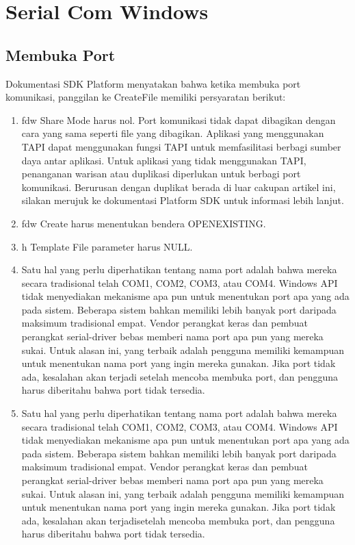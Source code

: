 \section{Serial Com Windows}
	\subsection{Membuka Port}

		Dokumentasi SDK Platform menyatakan bahwa ketika membuka port komunikasi, panggilan ke CreateFile memiliki persyaratan berikut:

	

		\begin{enumerate} 
			
				\item  fdw Share Mode harus nol. Port komunikasi tidak dapat dibagikan dengan cara yang sama seperti file yang dibagikan. Aplikasi yang menggunakan TAPI dapat menggunakan fungsi TAPI untuk memfasilitasi berbagi sumber daya antar aplikasi. Untuk aplikasi yang tidak menggunakan TAPI, penanganan warisan atau duplikasi diperlukan untuk berbagi port komunikasi. Berurusan dengan duplikat berada di luar cakupan artikel ini, silakan merujuk ke dokumentasi Platform SDK untuk informasi lebih lanjut.
				\item  fdw Create harus menentukan bendera OPENEXISTING.
				\item  h Template File parameter harus NULL.

			\item Satu hal yang perlu diperhatikan tentang nama port adalah bahwa mereka secara tradisional telah COM1, COM2, COM3, atau COM4. Windows API tidak menyediakan mekanisme apa pun untuk menentukan port apa yang ada pada sistem. Beberapa sistem bahkan memiliki lebih banyak port daripada maksimum tradisional empat. Vendor perangkat keras dan pembuat perangkat serial-driver bebas memberi nama port apa pun yang mereka sukai. Untuk alasan ini, yang terbaik adalah pengguna memiliki kemampuan untuk menentukan nama port yang ingin mereka gunakan. Jika port tidak ada, kesalahan akan terjadi setelah mencoba membuka port, dan pengguna harus diberitahu bahwa port tidak tersedia.

			\item Satu hal yang perlu diperhatikan tentang nama port adalah bahwa mereka secara tradisional telah COM1, COM2, COM3, atau COM4. Windows API tidak menyediakan mekanisme apa pun untuk menentukan port apa yang ada pada sistem. Beberapa sistem bahkan memiliki lebih banyak port daripada maksimum tradisional empat. Vendor perangkat keras dan pembuat perangkat serial-driver bebas memberi nama port apa pun yang mereka sukai. Untuk alasan ini, yang terbaik adalah pengguna memiliki kemampuan untuk menentukan nama port yang ingin mereka gunakan. Jika port tidak ada, kesalahan akan terjadisetelah mencoba membuka port, dan pengguna harus diberitahu bahwa port tidak tersedia.

		\end{enumerate}
		
